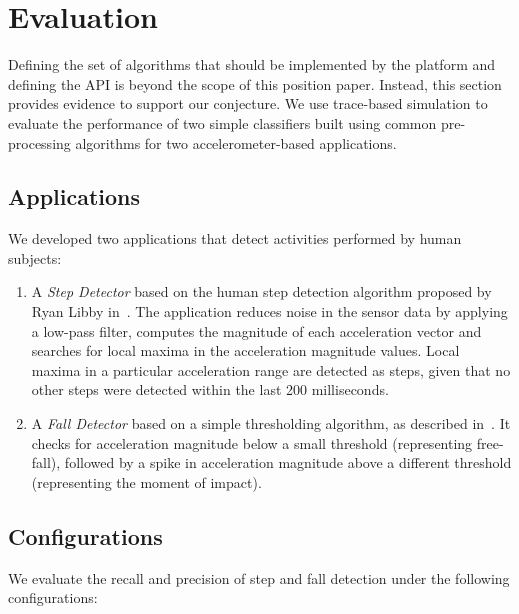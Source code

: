 \section{Evaluation}
\label{sec:validation}

Defining the set of algorithms that should be implemented by the
platform and defining the API is beyond the scope of this position
paper.  Instead, this section provides evidence to support our
conjecture.  We use trace-based simulation to evaluate the performance
of two simple classifiers built using common pre-processing algorithms
for two accelerometer-based applications.


\subsection{Applications}

We developed two applications that detect activities performed by 
human subjects:

\begin{enumerate}
\setlength{\itemsep}{-3pt}  

\item A {\em Step Detector} based on the human step detection algorithm
  proposed by Ryan Libby in~\cite{libbyFootstepDetection}. The
  application reduces noise in the sensor data by applying a low-pass 
  filter, computes the magnitude of each acceleration vector and searches 
  for local maxima in the acceleration magnitude values. Local maxima
  in a particular acceleration range are detected as steps, given
  that no other steps were detected within the last 200 milliseconds.

\item A {\em Fall Detector} based on a simple thresholding algorithm,
  as described in~\cite{kangasFallDetection}.  It checks for acceleration magnitude 
  below a small threshold (representing free-fall), followed by a spike in acceleration magnitude 
  above a different threshold (representing the moment of impact).

\end{enumerate}

\subsection{Configurations}

We evaluate the recall and precision of step and fall detection under the following configurations:

